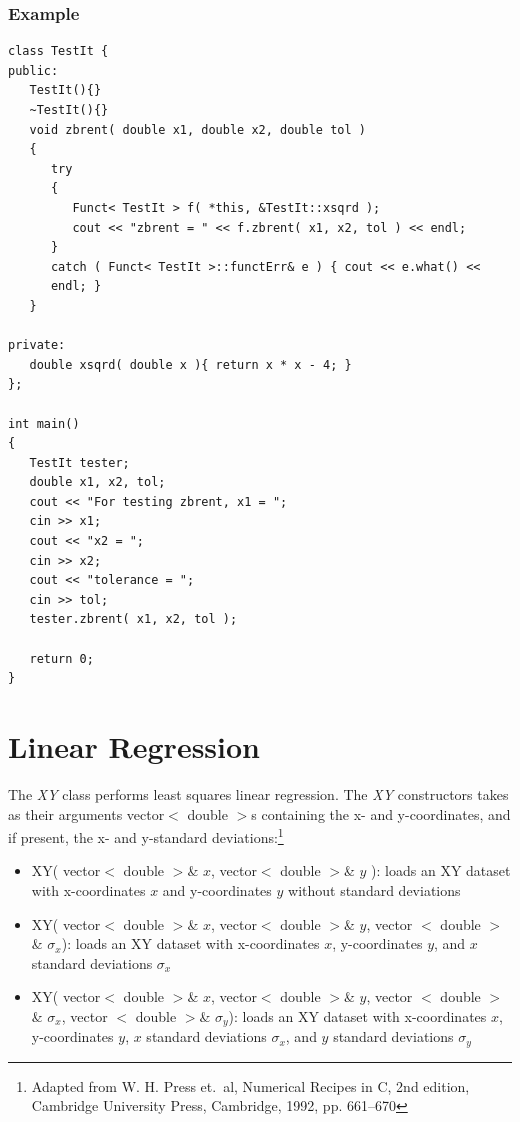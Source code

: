 \documentclass{report}
\begin{document}
\subsubsection{Example}
\begin{verbatim}
class TestIt {
public:
   TestIt(){}
   ~TestIt(){}
   void zbrent( double x1, double x2, double tol )
   {
      try
      {
         Funct< TestIt > f( *this, &TestIt::xsqrd );
         cout << "zbrent = " << f.zbrent( x1, x2, tol ) << endl;
      }
      catch ( Funct< TestIt >::functErr& e ) { cout << e.what() <<
      endl; }
   }

private:
   double xsqrd( double x ){ return x * x - 4; }
};

int main()
{
   TestIt tester;
   double x1, x2, tol;
   cout << "For testing zbrent, x1 = ";
   cin >> x1;
   cout << "x2 = ";
   cin >> x2;
   cout << "tolerance = ";
   cin >> tol;
   tester.zbrent( x1, x2, tol );

   return 0;
}
\end{verbatim}

\section{Linear Regression}

The {\em XY} class performs least squares linear regression. The {\em
XY} constructors takes as their arguments vector$<$ double $>$s
containing the x- and y-coordinates, and if present, the x- and
y-standard deviations:\footnote{Adapted from W. H. Press et.\ al,
Numerical Recipes in C, 2nd edition, Cambridge University Press,
Cambridge, 1992, pp. 661--670}
\begin{itemize}
\item XY( vector$<$ double $>$\& $x$, vector$<$ double $>$\& $y$ ):
loads an XY dataset with x-coordinates $x$ and y-coordinates $y$
without standard deviations
\item XY( vector$<$ double $>$\& $x$, vector$<$ double $>$\& $y$,
vector $<$ double $>$\& $\sigma_x$): loads an XY dataset with
x-coordinates $x$, y-coordinates $y$, and $x$ standard deviations
$\sigma_x$
\item XY( vector$<$ double $>$\& $x$, vector$<$ double $>$\& $y$,
vector $<$ double $>$\& $\sigma_x$, vector $<$ double $>$\&
$\sigma_y$): loads an XY dataset with x-coordinates $x$, y-coordinates
$y$, $x$ standard deviations $\sigma_x$, and $y$ standard deviations
$\sigma_y$
\end{itemize}
\end{document}
